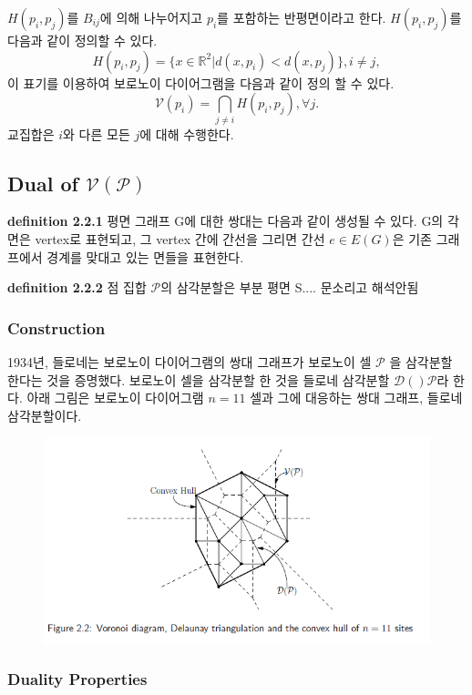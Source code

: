 \documentclass{article}
\begin{document}
$H(p_i, p_j)$를 $B_{ij}$에 의해 나누어지고 $p_i$를 포함하는 반평면이라고 한다. $H(p_i,p_j)$를 
다음과 같이 정의할 수 있다. 
$$
H(p_i, p_j) = \{ x \in \mathbb{R}^2 | d(x, p_i) < d(x, p_j) \}, i \ne j,
$$ 
이 표기를 이용하여 보로노이 다이어그램을 다음과 같이 정의 할 수 있다. 
$$
\mathcal{V}(p_i) = \bigcap_{j \ne i}H(p_i, p_j), \forall j.
$$
교집합은 $i$와 다른 모든 $j$에 대해 수행한다. 

\subsection{Dual of $\mathcal{V}(\mathcal{P})$}

\textbf{definition 2.2.1} 평면 그래프 G에 대한 쌍대는 다음과 같이 생성될 수 있다. 
G의 각 면은 vertex로 표현되고, 그 vertex 간에 간선을 그리면 
간선 $e \in E(G)$은 기존 그래프에서 경계를 맞대고 있는 면들을 표현한다.  

\textbf{definition 2.2.2} 점 집합 $\mathcal{P}$의 삼각분할은 부분 평면 S.... 문소리고 해석안됨 

\subsubsection {Construction}

1934년, 들로네는 보로노이 다이어그램의 쌍대 그래프가 보로노이 셀 $\mathcal{P}$  
을 삼각분할 한다는 것을 증명했다. 보로노이 셀을 삼각분할 한 것을 들로네 삼각분할 
$\mathcal{D}()\mathcal{P}$라 한다. 아래 그림은 보로노이 다이어그램 $n=11$ 셀과 
그에 대응하는 쌍대 그래프, 들로네 삼각분할이다. 

\begin{figure}[h]
    \includegraphics{capture2.PNG}
\end{figure}

\subsubsection{Duality Properties} 
\end{document}

